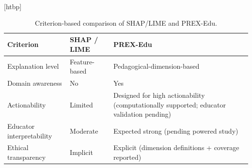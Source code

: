 \begin{table}
\small[htbp]
\caption{Criterion-based comparison of SHAP/LIME and PREX-Edu.}
\label{tab:T02_shap_lime_vs_prex}
\begin{tabular}{lll}
\toprule
Criterion & SHAP / LIME & PREX-Edu \\
\midrule
Explanation level & Feature-based & Pedagogical-dimension-based \\
Domain awareness & No & Yes \\
Actionability & Limited & Designed for high actionability (computationally supported; educator validation pending) \\
Educator interpretability & Moderate & Expected strong (pending powered study) \\
Ethical transparency & Implicit & Explicit (dimension definitions + coverage reported) \\
\bottomrule
\end{tabular}
\end{table}
